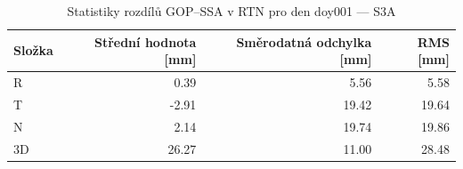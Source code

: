 \begin{table}[H]
\centering
\caption{Statistiky rozdílů GOP–SSA v RTN pro den doy001 — S3A}
\label{tab:gop_vs_ssa_s3a_doy001_day_stats}
\begin{tabular}{lrrr}
\toprule
Složka & Střední hodnota [mm] & Směrodatná odchylka [mm] & RMS [mm] \\
\midrule
R & 0.39 & 5.56 & 5.58 \\
T & -2.91 & 19.42 & 19.64 \\
N & 2.14 & 19.74 & 19.86 \\
3D & 26.27 & 11.00 & 28.48 \\
\bottomrule
\end{tabular}
\end{table}
